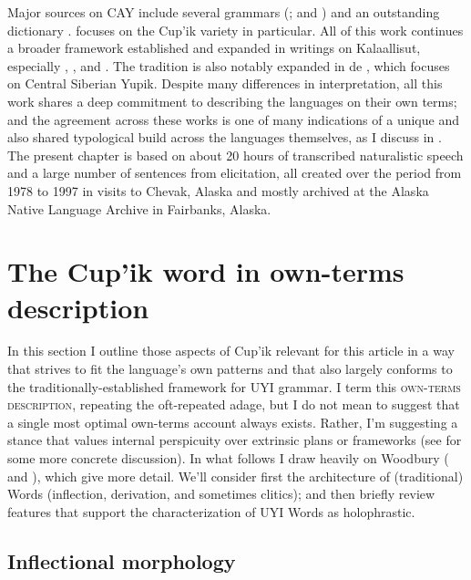 \documentclass[output=paper]{langscibook}
\begin{document}
Major sources on CAY include several grammars (\citealt{Reed1977}; \citealt{Jacobson1995} and \citealt{Miyaoka2012}) and an outstanding dictionary \citep{Jacobson2012}. \citet{Woodbury1981} focuses on the Cup'ik variety in particular. All of this work continues a broader framework established and expanded in writings on Kalaallisut, especially \citet{Kleinschmidt1851}, \citet{Bergsland1955}, \citet{Fortescue1984} and \citet{Sadock2003}. The tradition is also notably expanded in de \citet{Reuse1994}, which focuses on Central Siberian Yupik. Despite many differences in interpretation, all this work shares a deep commitment to describing the languages on their own terms; and the agreement across these works is one of many indications of a unique and also shared typological build across the languages themselves, as I discuss in \citet{Woodbury2017}. The present chapter is based on about 20 hours of transcribed naturalistic speech and a large number of sentences from elicitation, all created over the period from 1978 to 1997 in visits to Chevak, Alaska and mostly archived at the Alaska Native Language Archive in Fairbanks, Alaska.

\section{The Cup'ik word in own-terms description} \label{sec:3}

In this section I outline those aspects of Cup'ik relevant for this article in a way that strives to fit the language's own patterns and that also largely conforms to the traditionally-established framework for UYI grammar. I term this \textsc{own-terms} \textsc{description}, repeating the oft-repeated adage, but I do not mean to suggest that a single most optimal own-terms account always exists. Rather, I'm suggesting a stance that values internal perspicuity over extrinsic plans or frameworks (see \citealt{haspelmathword:2011} for some more concrete discussion). In what follows I draw heavily on Woodbury (\citeyear{Woodbury1981} and \citeyear{Woodbury2017}), which give more detail. We'll consider first the architecture of (traditional) Words (inflection, derivation, and sometimes clitics); and then briefly review features that support the characterization of UYI Words as holophrastic.

\subsection{Inflectional morphology} \label{sec:3.1}
\end{document}
